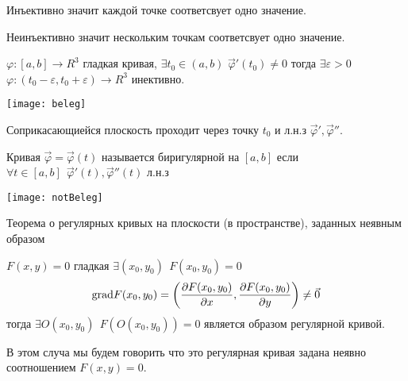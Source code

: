 \begin{define}
  Инъективно значит каждой точке соответсвует одно значение.

  Неинъективно значит нескольким точкам соответсвует одно значение.
\end{define}

\begin{theorem}
  $\varphi : [a,b] \to R^3$ гладкая кривая, $\exists t_0 \in (a,b)$
  $\vec \varphi' (t_0) \not = 0$ тогда $\exists \varepsilon > 0$
  $\varphi : (t_0 - \varepsilon, t_0 + \varepsilon) \to R^3$ инективно.
\end{theorem}

\begin{define}
  \texttt{[image: beleg]}

  Соприкасающиейся плоскость проходит через точку $t_0$ и л.н.з
  $\vec \varphi', \vec \varphi''$.
\end{define}

\begin{define}
  Кривая $\vec \varphi = \vec \varphi(t)$ называется биригулярной на
  $[a,b]$ если $\forall t \in [a,b] ~~ \vec \varphi' (t), \vec \varphi''(t)$
  л.н.з

  \texttt{[image: notBeleg]}
\end{define}

\begin{title}[\Large]
  Теорема о регулярных кривых на плоскости (в пространстве), заданных неявным
  образом
\end{title}

\begin{theorem}
  $F(x, y) = 0$ гладкая $\exists (x_0, y_0) ~~ F(x_0, y_0) = 0$
  $$
  \mathrm{grad} F(x_0, y_0) = \left( \frac{\partial F(x_0, y_0)}{\partial x},
  \frac{\partial F(x_0, y_0)}{\partial y} \right) \not= \vec 0
  $$
  тогда $\exists O(x_0, y_0) ~~ F(O(x_0, y_0)) = 0$ является образом
  регулярной кривой.

  В этом случа мы будем говорить что это регулярная кривая задана неявно
  соотношением $F(x, y) = 0$.
\end{theorem}

